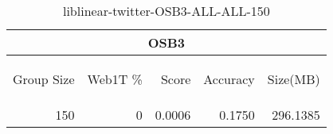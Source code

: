 \begin{center}
\begin{table}[htbp]
\begin{tabular}{ | r | r | r | r | r |}
\hline
\multicolumn{5}{|c|}{OSB3}\\
\hline
\begin{sideways}Group Size\end{sideways} & \begin{sideways}Web1T \%\end{sideways} & \begin{sideways}Score\end{sideways} & \begin{sideways}Accuracy\end{sideways} & \begin{sideways}Size(MB)\end{sideways}\\
\hline
\multirow{0}{*}{150}
 & 0 & 0.0006 & 0.1750 & 296.1385\\ \cline{2-5}
\hline
\end{tabular}
\caption{liblinear-twitter-OSB3-ALL-ALL-150}
\label{table:liblinear-twitter-OSB3-ALL-ALL-150}
\end{table}
\end{center}

